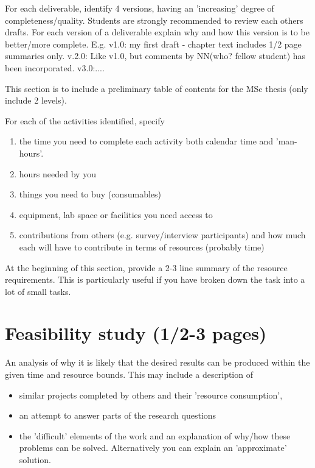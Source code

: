 \documentclass[informationsecurity]{gucmasterproject}
\begin{document}
For each deliverable, identify 4 versions, having an
'increasing' degree of completeness/quality.
Students are strongly recommended to review each others drafts.
For each version of a deliverable explain why and how this version is to
be better/more complete.  E.g. v1.0: my first draft -
chapter text includes 1/2 page summaries only.
v.2.0: Like v1.0, but comments by NN(who? fellow student)
has been incorporated. v3.0:....

This section is to include a preliminary table of contents for the MSc thesis
(only include 2 levels).

For each of the activities identified, specify
\begin{enumerate}
\item  the time you need to complete each activity both calendar time and 'man-hours'.
\item  hours needed by you
\item  things you need to buy (consumables)
\item  equipment, lab space or facilities you need access to
\item  contributions from others (e.g. survey/interview participants) and how much each will have to contribute in terms of resources (probably time)
\end{enumerate}
At the beginning of this section, provide a 2-3 line summary of the
resource requirements.  This is particularly useful if you have broken
down the task into a lot of small tasks.

\chapter{Feasibility study (1/2-3 pages)}
An analysis of why it is likely that the desired
results can be produced within the given time and
resource bounds.  This may include a description of
\begin{itemize}
\item similar projects completed by others and their 'resource consumption',
\item an attempt to answer parts of the research questions
\item the 'difficult' elements of the work and an explanation of why/how these problems can be solved.  
Alternatively you can explain an 'approximate' solution.
\end{itemize}
\end{document}
